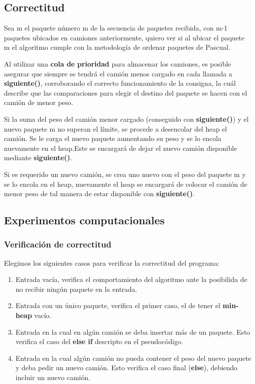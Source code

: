 \documentclass[a4paper, 10pt, twoside]{article}
\begin{document}
\subsection{Correctitud}
Sea m el paquete número m de la secuencia de paquetes recibida, con m-1 paquetes ubicados en camiones anteriormente, quiero ver si al ubicar el paquete m el algoritmo cumple con la metodología de ordenar paquetes de Pascual.

Al utilizar una \textbf{cola de prioridad} para almacenar los camiones, es posible asegurar que siempre se tendrá el camión menos cargado en cada llamada a \textbf{siguiente()}, corroborando el correcto funcionamiento de la consigna, la cuál describe que las comparaciones para elegir el destino del paquete se hacen con el camión de menor peso. 

Si la suma del peso del camión menor cargado (conseguido con \textbf{siguiente()}) y el nuevo paquete m no superan el límite, se procede a desencolar del heap el camión. Se le carga el nuevo paquete aumentando su peso y se lo encola nuevamente en el heap.Este se encargará de dejar el nuevo camión disponible mediante \textbf{siguiente()}.

Si es requerido un nuevo camión, se crea uno nuevo con el peso del paquete m y se lo encola en el heap, nuevamente el heap se encargará de colocar el camión de menor peso de tal manera de estar disponible con \textbf{siguiente()}.

\subsection{Experimentos computacionales}
\subsubsection{Verificación de correctitud}
Elegimos los siguientes casos para verificar la correctitud del programa:
\begin{enumerate}
	\item Entrada vacía, verifica el comportamiento del algoritmo ante la posibilida de no recibir ningún paquete en la entrada.
	\item Entrada con un único paquete, verifica el primer caso, el de tener el \textbf{min-heap} vacío.
	\item Entrada en la cual en algún camión se deba insertar más de un paquete. Esto verifica el caso del \textbf{else if} descripto en el pseudocódigo.
	\item Entrada en la cual algún camión no pueda contener el peso del nuevo paquete y deba pedir un nuevo camión. Esto verifica el caso final (\textbf{else}), debiendo incluir un nuevo camión.
\end{enumerate}
\end{document}
